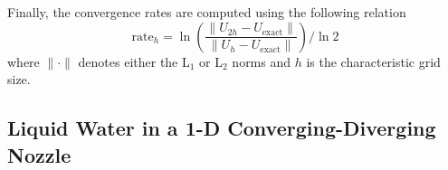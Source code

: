 \documentclass[review,10pt]{elsarticle}
\begin{document}
Finally, the convergence rates are computed using the following relation 
\begin{equation}
\label{eq:conv_rates}
\text{rate}_h = \ln \left( \frac{\| U_{2h}-U_{\text{exact}} \|}{\| U_{h}-U_{\text{exact}}\| } \right) / \ln 2
\end{equation}
where $\| \cdot \|$ denotes either the L$_1$ or L$_2$ norms and $h$ is the characteristic grid size.

\subsection{Liquid Water in a 1-D Converging-Diverging Nozzle} \label{sec:liquid_nozzle}
\end{document}
